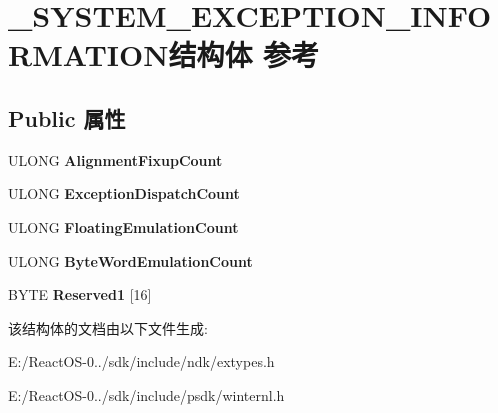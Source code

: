 \hypertarget{struct___s_y_s_t_e_m___e_x_c_e_p_t_i_o_n___i_n_f_o_r_m_a_t_i_o_n}{}\section{\+\_\+\+S\+Y\+S\+T\+E\+M\+\_\+\+E\+X\+C\+E\+P\+T\+I\+O\+N\+\_\+\+I\+N\+F\+O\+R\+M\+A\+T\+I\+O\+N结构体 参考}
\label{struct___s_y_s_t_e_m___e_x_c_e_p_t_i_o_n___i_n_f_o_r_m_a_t_i_o_n}
\subsection*{Public 属性}
\begin{DoxyCompactItemize}
\item 
\mbox{\label{struct___s_y_s_t_e_m___e_x_c_e_p_t_i_o_n___i_n_f_o_r_m_a_t_i_o_n_ab711c338a2cfd26a50092632c5e1729e}} 
U\+L\+O\+NG {\bfseries Alignment\+Fixup\+Count}
\item 
\mbox{\label{struct___s_y_s_t_e_m___e_x_c_e_p_t_i_o_n___i_n_f_o_r_m_a_t_i_o_n_a3222b4cf6df2ac50d750ea576a5cf39e}} 
U\+L\+O\+NG {\bfseries Exception\+Dispatch\+Count}
\item 
\mbox{\label{struct___s_y_s_t_e_m___e_x_c_e_p_t_i_o_n___i_n_f_o_r_m_a_t_i_o_n_a0a7f7f9a6089708055272966a0e266f1}} 
U\+L\+O\+NG {\bfseries Floating\+Emulation\+Count}
\item 
\mbox{\label{struct___s_y_s_t_e_m___e_x_c_e_p_t_i_o_n___i_n_f_o_r_m_a_t_i_o_n_a4d7db9785e3d6e025c8d6dce77d1ad07}} 
U\+L\+O\+NG {\bfseries Byte\+Word\+Emulation\+Count}
\item 
\mbox{\label{struct___s_y_s_t_e_m___e_x_c_e_p_t_i_o_n___i_n_f_o_r_m_a_t_i_o_n_a979c4a39c37640dc719049af1923a06d}} 
B\+Y\+TE {\bfseries Reserved1} \mbox{[}16\mbox{]}
\end{DoxyCompactItemize}


该结构体的文档由以下文件生成\+:\begin{DoxyCompactItemize}
\item 
E\+:/\+React\+O\+S-\/0../sdk/include/ndk/extypes.\+h\item 
E\+:/\+React\+O\+S-\/0../sdk/include/psdk/winternl.\+h\end{DoxyCompactItemize}
